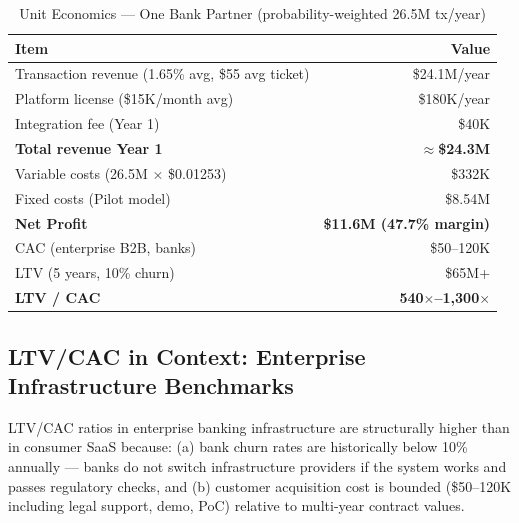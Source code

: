 \documentclass[11pt,a4paper]{article}
\begin{document}
\begin{table}[htbp]
\centering
\caption{Unit Economics --- One Bank Partner (probability-weighted 26.5M tx/year)}
\begin{tabularx}{\linewidth}{@{}Xr@{}}
\toprule
\textbf{Item} & \textbf{Value} \\
\midrule
Transaction revenue (1.65\% avg, \$55 avg ticket)  & \$24.1M/year \\
Platform license (\$15K/month avg)                      & \$180K/year  \\
Integration fee (Year 1)                                & \$40K        \\
\textbf{Total revenue Year 1}                           & \textbf{$\approx$\$24.3M} \\
\midrule
Variable costs (26.5M $\times$ \$0.01253)               & \$332K     \\
Fixed costs (Pilot model)                               & \$8.54M      \\
\textbf{Net Profit}                                     & \textbf{\$11.6M (47.7\% margin)} \\
\midrule
CAC (enterprise B2B, banks)                             & \$50--120K   \\
LTV (5 years, 10\% churn)                               & \$65M+      \\
\textbf{LTV / CAC}                                      & \textbf{540$\times$--1,300$\times$} \\
\bottomrule
\end{tabularx}
\end{table}

\subsection*{LTV/CAC in Context: Enterprise Infrastructure Benchmarks}

LTV/CAC ratios in enterprise banking infrastructure are structurally higher than in consumer SaaS because: (a) bank churn rates are historically below 10\% annually --- banks do not switch infrastructure providers if the system works and passes regulatory checks, and (b) customer acquisition cost is bounded (\$50--120K including legal support, demo, PoC) relative to multi-year contract values.
\end{document}
